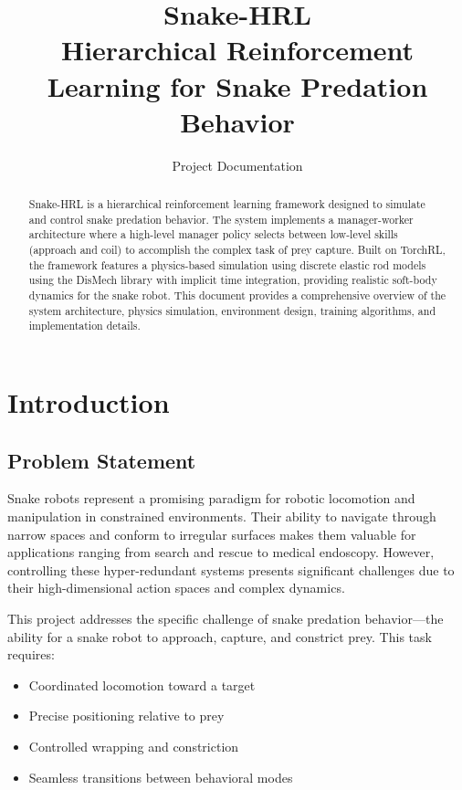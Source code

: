 \documentclass[11pt]{article}
\title{Snake-HRL\\[0.3em]\large Hierarchical Reinforcement Learning for Snake Predation Behavior}
\author{Project Documentation}
\date{}
\begin{document}
\maketitle

\begin{abstract}
\noindent Snake-HRL is a hierarchical reinforcement learning framework designed to simulate and control snake predation behavior. The system implements a manager-worker architecture where a high-level manager policy selects between low-level skills (approach and coil) to accomplish the complex task of prey capture. Built on TorchRL, the framework features a physics-based simulation using discrete elastic rod models using the DisMech library with implicit time integration, providing realistic soft-body dynamics for the snake robot. This document provides a comprehensive overview of the system architecture, physics simulation, environment design, training algorithms, and implementation details.
\end{abstract}

\tableofcontents
\newpage

\section{Introduction}

\subsection{Problem Statement}

Snake robots represent a promising paradigm for robotic locomotion and manipulation in constrained environments. Their ability to navigate through narrow spaces and conform to irregular surfaces makes them valuable for applications ranging from search and rescue to medical endoscopy. However, controlling these hyper-redundant systems presents significant challenges due to their high-dimensional action spaces and complex dynamics.

This project addresses the specific challenge of snake predation behavior---the ability for a snake robot to approach, capture, and constrict prey. This task requires:
\begin{itemize}
    \item Coordinated locomotion toward a target
    \item Precise positioning relative to prey
    \item Controlled wrapping and constriction
    \item Seamless transitions between behavioral modes
\end{itemize}
\end{document}

